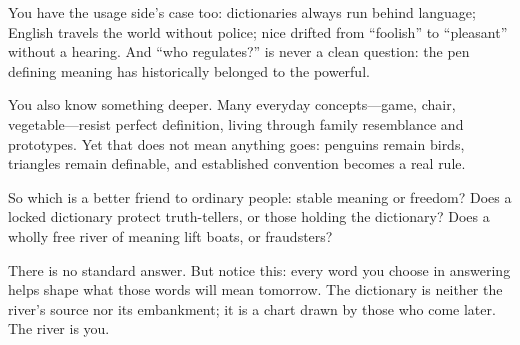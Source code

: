 You have the usage side's case too: dictionaries always run behind language; English travels the world without police; nice drifted from ``foolish'' to ``pleasant'' without a hearing. And ``who regulates?'' is never a clean question: the pen defining meaning has historically belonged to the powerful.

You also know something deeper. Many everyday concepts---game, chair, vegetable---resist perfect definition, living through family resemblance and prototypes. Yet that does not mean anything goes: penguins remain birds, triangles remain definable, and established convention becomes a real rule.

So which is a better friend to ordinary people: stable meaning or freedom? Does a locked dictionary protect truth-tellers, or those holding the dictionary? Does a wholly free river of meaning lift boats, or fraudsters?

There is no standard answer. But notice this: every word you choose in answering helps shape what those words will mean tomorrow. The dictionary is neither the river's source nor its embankment; it is a chart drawn by those who come later. The river is you.
